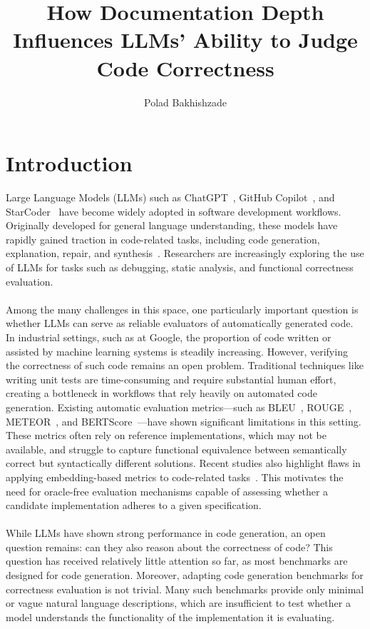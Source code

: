 \documentclass[a4paper]{usiinfbachelorproject}
\author{Polad Bakhishzade}
\title{\textbf{How Documentation Depth Influences LLMs' Ability to Judge Code Correctness}}
\begin{document}
\maketitle
\tableofcontents\newpage

\section{Introduction}\label{sec:intro}
Large Language Models (LLMs) such as ChatGPT~\cite{openai2023chatgpt}, GitHub Copilot~\cite{githubcopilot}, and StarCoder~\cite{li2023starcoder} have become widely adopted in software development workflows. Originally developed for general language understanding, these models have rapidly gained traction in code-related tasks, including code generation, explanation, repair, and synthesis~\cite{jiang2024survey, chen2021codex, wang2023codet}. Researchers are increasingly exploring the use of LLMs for tasks such as debugging, static analysis, and functional correctness evaluation.\\
\\[2pt]
Among the many challenges in this space, one particularly important question is whether LLMs can serve as reliable evaluators of automatically generated code. In industrial settings, such as at Google, the proportion of code written or assisted by machine learning systems is steadily increasing. However, verifying the correctness of such code remains an open problem. Traditional techniques like writing unit tests are time-consuming and require substantial human effort, creating a bottleneck in workflows that rely heavily on automated code generation. Existing automatic evaluation metrics—such as BLEU~\cite{papineni2002bleu}, ROUGE~\cite{lin2004rouge}, METEOR~\cite{banerjee2005meteor}, and BERTScore~\cite{zhang2019bertscore}—have shown significant limitations in this setting. These metrics often rely on reference implementations, which may not be available, and struggle to capture functional equivalence between semantically correct but syntactically different solutions. Recent studies also highlight flaws in applying embedding-based metrics to code-related tasks~\cite{naik2024limitations}. This motivates the need for oracle-free evaluation mechanisms capable of assessing whether a candidate implementation adheres to a given specification.\\
\\[2pt]
While LLMs have shown strong performance in code generation, an open question remains: can they also reason about the correctness of code? This question has received relatively little attention so far, as most benchmarks are designed for code generation. Moreover, adapting code generation benchmarks for correctness evaluation is not trivial. Many such benchmarks provide only minimal or vague natural language descriptions, which are insufficient to test whether a model understands the functionality of the implementation it is evaluating.\\
\end{document}
